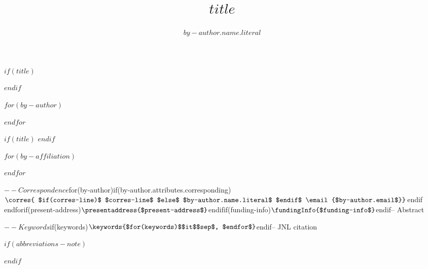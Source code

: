 $if(title)$
\title{$title$}
$endif$

$for(by-author)$
\author[$for(by-author.affiliations)$$it.number$$sep$,$endfor$]{$by-author.name.literal$}
$endfor$

$if(title)$
$endif$

$for(by-affiliation)$
\address[$it.number$]{%
}
$endfor$

$-- Correspondence
$for(by-author)$
$if(by-author.attributes.corresponding)$
\corres{
$if(corres-line)$
$corres-line$
$else$
$by-author.name.literal$
$endif$
\email{$by-author.email$}}$endif$
$endfor$
$if(present-address)$
\presentaddress{$present-address$}
$endif$

$if(funding-info)$
\fundingInfo{$funding-info$}
$endif$

$-- Abstract

$-- Keywords
$if(keywords)$
\keywords{$for(keywords)$$it$$sep$, $endfor$}
$endif$

$-- JNL citation

\maketitle

$if(abbreviations-note)$
\renewcommand\thefootnote{}

\renewcommand\thefootnote{\fnsymbol{footnote}}
\setcounter{footnote}{1}
$endif$